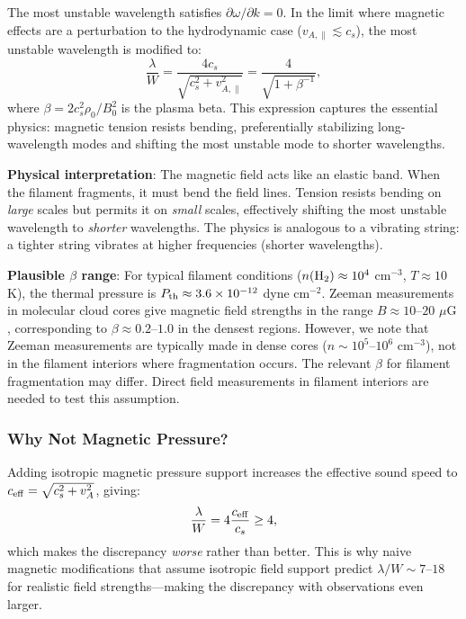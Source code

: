 \documentclass[11pt,a4paper]{article}
\begin{document}
The most unstable wavelength satisfies $\partial \omega/\partial k = 0$. In the limit where magnetic effects are a perturbation to the hydrodynamic case ($v_{A,\parallel} \lesssim c_s$), the most unstable wavelength is modified to:
\begin{equation}
\frac{\lambda}{W} = \frac{4c_s}{\sqrt{c_s^2 + v_{A,\parallel}^2}} = \frac{4}{\sqrt{1 + \beta^{-1}}},
\label{eq:tension_lambda}
\end{equation}
where $\beta = 2c_s^2\rho_0/B_0^2$ is the plasma beta. This expression captures the essential physics: magnetic tension resists bending, preferentially stabilizing long-wavelength modes and shifting the most unstable mode to shorter wavelengths.

\textbf{Physical interpretation}: The magnetic field acts like an elastic band. When the filament fragments, it must bend the field lines. Tension resists bending on \textit{large} scales but permits it on \textit{small} scales, effectively shifting the most unstable wavelength to \textit{shorter} wavelengths. The physics is analogous to a vibrating string: a tighter string vibrates at higher frequencies (shorter wavelengths).

\textbf{Plausible $\beta$ range}: For typical filament conditions ($n({\rm H_2}) \approx 10^4$ cm$^{-3}$, $T \approx 10$ K), the thermal pressure is $P_{\rm th} \approx 3.6 \times 10^{-12}$ dyne cm$^{-2}$. Zeeman measurements in molecular cloud cores give magnetic field strengths in the range $B \approx 10$--$20$ $\mu$G \citep{Crutcher2012}, corresponding to $\beta \approx 0.2$--$1.0$ in the densest regions. However, we note that Zeeman measurements are typically made in dense cores ($n \sim 10^5$--$10^6$ cm$^{-3}$), not in the filament interiors where fragmentation occurs. The relevant $\beta$ for filament fragmentation may differ. Direct field measurements in filament interiors are needed to test this assumption.

\subsubsection{Why Not Magnetic Pressure?}

Adding isotropic magnetic pressure support increases the effective sound speed to $c_{\rm eff} = \sqrt{c_s^2 + v_A^2}$, giving:
\begin{equation}
\frac{\lambda}{W} = 4 \frac{c_{\rm eff}}{c_s} \geq 4,
\end{equation}
which makes the discrepancy \emph{worse} rather than better. This is why naive magnetic modifications that assume isotropic field support predict $\lambda/W \sim 7$--$18$ for realistic field strengths—making the discrepancy with observations even larger.
\end{document}
